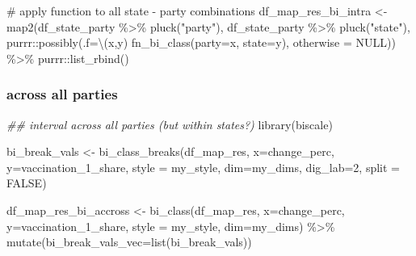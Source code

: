 \documentclass[
  letterpaper,
  DIV=11,
  numbers=noendperiod,
  oneside]{scrartcl}
\newenvironment{Shaded}{\begin{snugshade}}{\end{snugshade}}
\newcommand{\AttributeTok}[1]{\textcolor[rgb]{0.40,0.45,0.13}{#1}}
\newcommand{\CommentTok}[1]{\textcolor[rgb]{0.37,0.37,0.37}{#1}}
\newcommand{\ConstantTok}[1]{\textcolor[rgb]{0.56,0.35,0.01}{#1}}
\newcommand{\DecValTok}[1]{\textcolor[rgb]{0.68,0.00,0.00}{#1}}
\newcommand{\DocumentationTok}[1]{\textcolor[rgb]{0.37,0.37,0.37}{\textit{#1}}}
\newcommand{\FunctionTok}[1]{\textcolor[rgb]{0.28,0.35,0.67}{#1}}
\newcommand{\NormalTok}[1]{\textcolor[rgb]{0.00,0.23,0.31}{#1}}
\newcommand{\OtherTok}[1]{\textcolor[rgb]{0.00,0.23,0.31}{#1}}
\newcommand{\SpecialCharTok}[1]{\textcolor[rgb]{0.37,0.37,0.37}{#1}}
\newcommand{\StringTok}[1]{\textcolor[rgb]{0.13,0.47,0.30}{#1}}
\begin{document}
\begin{Shaded}
\begin{Highlighting}[]
\CommentTok{\# apply function to all state {-} party combinations}
\NormalTok{df\_map\_res\_bi\_intra }\OtherTok{\textless{}{-}} \FunctionTok{map2}\NormalTok{(df\_state\_party }\SpecialCharTok{\%\textgreater{}\%} \FunctionTok{pluck}\NormalTok{(}\StringTok{"party"}\NormalTok{),}
\NormalTok{       df\_state\_party }\SpecialCharTok{\%\textgreater{}\%} \FunctionTok{pluck}\NormalTok{(}\StringTok{"state"}\NormalTok{), }
\NormalTok{       purrr}\SpecialCharTok{::}\FunctionTok{possibly}\NormalTok{(}\AttributeTok{.f=}\NormalTok{\textbackslash{}(x,y) }\FunctionTok{fn\_bi\_class}\NormalTok{(}\AttributeTok{party=}\NormalTok{x, }\AttributeTok{state=}\NormalTok{y), }
                                  \AttributeTok{otherwise =} \ConstantTok{NULL}\NormalTok{)) }\SpecialCharTok{\%\textgreater{}\%} 
\NormalTok{  purrr}\SpecialCharTok{::}\FunctionTok{list\_rbind}\NormalTok{()}
\end{Highlighting}
\end{Shaded}

\hypertarget{across-all-parties}{%
\subsubsection{across all parties}\label{across-all-parties}}

\begin{Shaded}
\begin{Highlighting}[]
\DocumentationTok{\#\# interval across all parties (but within states?)}
\FunctionTok{library}\NormalTok{(biscale)}

\NormalTok{bi\_break\_vals }\OtherTok{\textless{}{-}} \FunctionTok{bi\_class\_breaks}\NormalTok{(df\_map\_res, }
    \AttributeTok{x=}\NormalTok{change\_perc, }\AttributeTok{y=}\NormalTok{vaccination\_1\_share, }\AttributeTok{style =}\NormalTok{ my\_style, }\AttributeTok{dim=}\NormalTok{my\_dims, }
    \AttributeTok{dig\_lab=}\DecValTok{2}\NormalTok{,}
    \AttributeTok{split =} \ConstantTok{FALSE}\NormalTok{)}

\NormalTok{df\_map\_res\_bi\_accross }\OtherTok{\textless{}{-}} \FunctionTok{bi\_class}\NormalTok{(df\_map\_res, }\AttributeTok{x=}\NormalTok{change\_perc, }\AttributeTok{y=}\NormalTok{vaccination\_1\_share, }\AttributeTok{style =}\NormalTok{ my\_style, }\AttributeTok{dim=}\NormalTok{my\_dims) }\SpecialCharTok{\%\textgreater{}\%} 
     \FunctionTok{mutate}\NormalTok{(}\AttributeTok{bi\_break\_vals\_vec=}\FunctionTok{list}\NormalTok{(bi\_break\_vals))}
\end{Highlighting}
\end{Shaded}
\end{document}
